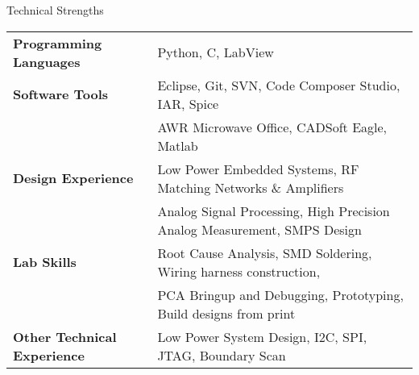 \documentclass{resume} %
\begin{document}
\begin{rSection}{Technical Strengths}

\begin{tabular}{ @{} >{\bfseries}l @{\hspace{6ex}} l }
Programming Languages & Python, C, LabView  \smallskip \\

Software Tools & Eclipse, Git, SVN, Code Composer Studio, IAR, Spice\\ 
 & AWR Microwave Office, CADSoft Eagle, Matlab \smallskip \\

Design Experience & Low Power Embedded Systems, RF Matching Networks \& Amplifiers\\
 & Analog Signal Processing, High Precision Analog Measurement, SMPS Design \smallskip \\
 
Lab Skills & Root Cause Analysis, SMD Soldering, Wiring harness construction,\\
& PCA Bringup and Debugging, Prototyping, Build designs from print\smallskip \\
 
Other Technical Experience &  Low Power System Design, I2C, SPI, JTAG, Boundary Scan \\
\end{tabular}

\end{rSection}
\medskip

\end{document}
